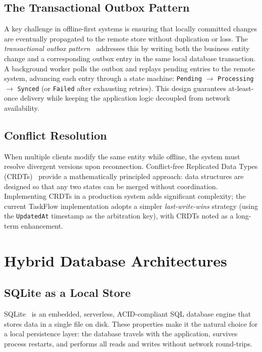 \subsection*{The Transactional Outbox Pattern}

A key challenge in offline-first systems is ensuring that locally committed changes are
eventually propagated to the remote store without duplication or loss.
The \emph{transactional outbox pattern}~\cite{fowler2002patterns} addresses this by
writing both the business entity change and a corresponding outbox entry in the same
local database transaction.
A background worker polls the outbox and replays pending entries to the remote system,
advancing each entry through a state machine: \texttt{Pending} $\to$
\texttt{Processing} $\to$ \texttt{Synced} (or \texttt{Failed} after exhausting retries).
This design guarantees at-least-once delivery while keeping the application logic
decoupled from network availability.

\subsection*{Conflict Resolution}

When multiple clients modify the same entity while offline, the system must resolve
divergent versions upon reconnection.
Conflict-free Replicated Data Types (CRDTs)~\cite{shapiro2011crdt,kleppmann2019crdt}
provide a mathematically principled approach: data structures are designed so that
any two states can be merged without coordination.
Implementing CRDTs in a production system adds significant complexity; the current
TaskFlow implementation adopts a simpler \emph{last-write-wins} strategy (using the
\texttt{UpdatedAt} timestamp as the arbitration key), with CRDTs noted as a long-term
enhancement.

\section{Hybrid Database Architectures}\label{sec:bg_databases}

\subsection*{SQLite as a Local Store}

SQLite~\cite{hipp2022sqlite} is an embedded, serverless, ACID-compliant SQL
database engine that stores data in a single file on disk.
These properties make it the natural choice for a local persistence layer: the database
travels with the application, survives process restarts, and performs all reads and
writes without network round-trips.

